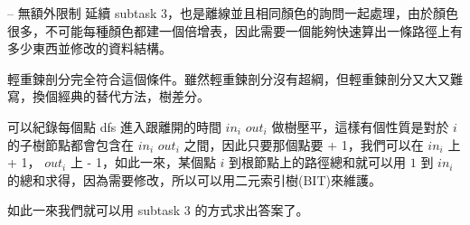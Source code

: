 \documentclass[hyperref,UTF8,notheorems,xcolor={dvipsnames}]{beamer}
\newcommand{\btitle}[1]{{\secname} -- #1}
\theoremstyle{definition}
\begin{document}
\begin{frame}[fragile]{\btitle{無額外限制}}
	延續 subtask 3，也是離線並且相同顏色的詢問一起處理，由於顏色很多，不可能每種顏色都建一個倍增表，因此需要一個能夠快速算出一條路徑上有多少東西並修改的資料結構。
	\pause

	輕重鍊剖分完全符合這個條件。雖然輕重鍊剖分沒有超綱，但輕重鍊剖分又大又難寫，換個經典的替代方法，樹差分。
	\pause
	
	可以紀錄每個點 dfs 進入跟離開的時間 $in_i$ $out_i$ 做樹壓平，這樣有個性質是對於 $i$ 的子樹節點都會包含在 $in_i$ $out_i$ 之間，因此只要那個點要 + 1，我們可以在 $in_i$ 上 + 1， $out_i$ 上 - 1，如此一來，某個點 $i$ 到根節點上的路徑總和就可以用 $1$ 到 $in_i$ 的總和求得，因為需要修改，所以可以用二元索引樹(BIT)來維護。

	如此一來我們就可以用 subtask 3 的方式求出答案了。
\end{frame}
\end{document}
